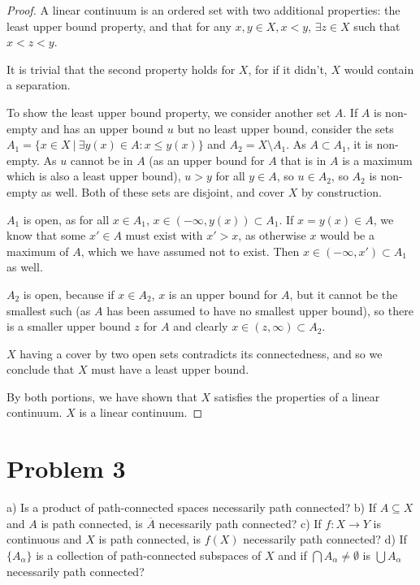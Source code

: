 \documentclass[11pt]{article}
\begin{document}
\begin{proof}
A linear continuum is an ordered set with two additional properties: the least
upper bound property, and that for any \(x,y\in X, x<y\), \(\exists z \in X\) such
that \(x < z < y\).

It is trivial that the second property holds for \(X\), for if it didn't, \(X\)
would contain a separation. 

To show the least upper bound property, we consider another set \(A\). If \(A\) is
non-empty and has an upper bound \(u\) but no least upper bound, consider the sets
\(A_1 = \{x\in X\ |\ \exists y(x) \in A : x \leq y(x)\}\) and \(A_2 = X\setminus
A_1\). As \(A \subset A_1\), it is non-empty. As \(u\) cannot be in \(A\) (as an upper
bound for \(A\) that is in \(A\) is a maximum which is also a least upper bound), \(u
> y\) for all \(y\in A\), so \(u \in A_2\), so \(A_2\) is non-empty as well. Both of
these sets are disjoint, and cover \(X\) by construction.

\(A_1\) is open, as for all \(x \in A_1\), \(x\in(-\infty, y(x)) \subset A_1\). If \(x
= y(x) \in A\), we know that some \(x'\in A\) must exist with \(x' > x\), as
otherwise \(x\) would be a maximum of \(A\), which we have assumed not to exist.
Then \(x \in (-\infty, x')\subset A_1\) as well. 

\(A_2\) is open, because if \(x \in A_2\), \(x\) is an upper bound for \(A\), but it
cannot be the smallest such (as \(A\) has been assumed to have no smallest upper
bound), so there is a smaller upper bound \(z\) for \(A\) and clearly \(x \in (z,
\infty) \subset A_2\). 

\(X\) having a cover by two open sets contradicts its connectedness, and so we
conclude that \(X\) must have a least upper bound. 

By both portions, we have shown that \(X\) satisfies the properties of a linear
continuum. \(X\) is a linear continuum. 
\end{proof}

\section{Problem 3}
\label{sec:org36f579f}

a) Is a product of path-connected spaces necessarily path connected? 
b) If \(A\subseteq X\) and \(A\) is path connected, is \(\overline{A}\) necessarily
path connected? 
c) If \(f: X\rightarrow Y\) is continuous and \(X\) is path connected, is \(f(X)\)
necessarily path connected? 
d) If \(\{A_{\alpha}\}\) is a collection of path-connected subspaces of \(X\) and if
\(\bigcap A_{\alpha} \not = \emptyset\) is \(\bigcup A_{\alpha}\) necessarily path
connected? 
\end{document}

